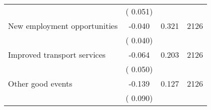 \begin{tabular}{l*{3}{c}}
                               &        (       0.051)            &                               &                               \\ 
 New employment opportunities                &             -0.040        &        0.321   & 2126              \\ 
                               &        (       0.040)            &                               &                               \\ 
 Improved transport services                &             -0.064        &        0.203   & 2126              \\ 
                               &        (       0.050)            &                               &                               \\ 
 Other good events                &             -0.139        &        0.127   & 2126              \\ 
                               &        (       0.090)            &                               &                               \\ 
\hline \end{tabular}                                                                                              
